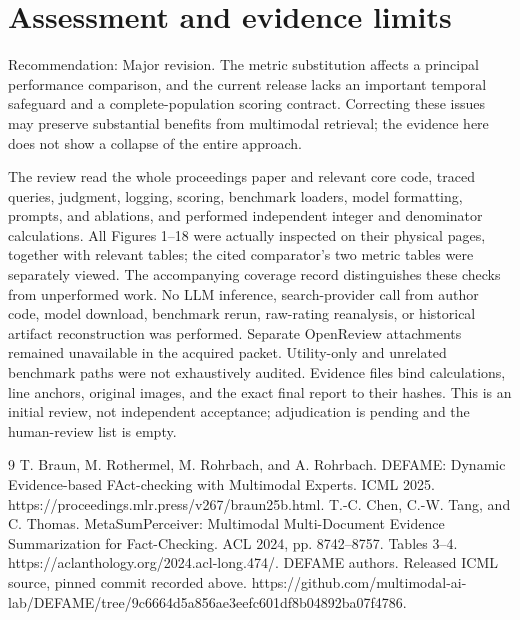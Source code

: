 \documentclass[10pt]{article}
\begin{document}
\section*{Assessment and evidence limits}
Recommendation: Major revision. The metric substitution affects a principal performance comparison, and the current release lacks an important temporal safeguard and a complete-population scoring contract. Correcting these issues may preserve substantial benefits from multimodal retrieval; the evidence here does not show a collapse of the entire approach.\par
The review read the whole proceedings paper and relevant core code, traced queries, judgment, logging, scoring, benchmark loaders, model formatting, prompts, and ablations, and performed independent integer and denominator calculations. All Figures 1–18 were actually inspected on their physical pages, together with relevant tables; the cited comparator’s two metric tables were separately viewed. The accompanying coverage record distinguishes these checks from unperformed work. No LLM inference, search-provider call from author code, model download, benchmark rerun, raw-rating reanalysis, or historical artifact reconstruction was performed. Separate OpenReview attachments remained unavailable in the acquired packet. Utility-only and unrelated benchmark paths were not exhaustively audited. Evidence files bind calculations, line anchors, original images, and the exact final report to their hashes. This is an initial review, not independent acceptance; adjudication is pending and the human-review list is empty.\par
9 T. Braun, M. Rothermel, M. Rohrbach, and A. Rohrbach. DEFAME: Dynamic Evidence-based FAct-checking with Multimodal Experts. ICML 2025. https://proceedings.mlr.press/v267/braun25b.html. T.-C. Chen, C.-W. Tang, and C. Thomas. MetaSumPerceiver: Multimodal Multi-Document Evidence Summarization for Fact-Checking. ACL 2024, pp. 8742–8757. Tables 3–4. https://aclanthology.org/2024.acl-long.474/. DEFAME authors. Released ICML source, pinned commit recorded above. https://github.com/multimodal-ai-lab/DEFAME/tree/9c6664d5a856ae3eefc601df8b04892ba07f4786.\par
\end{document}
